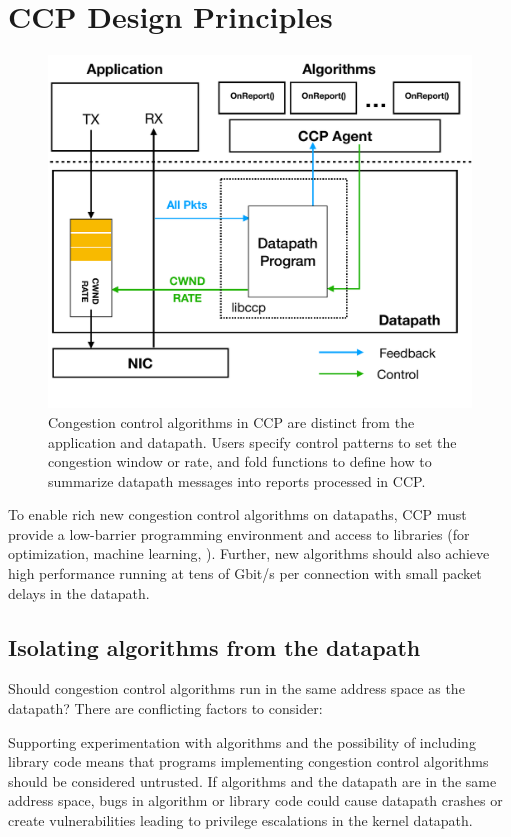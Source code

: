 \section{CCP Design Principles}
\label{s:design}
%
\begin{figure}[t]
\centering
    \includegraphics[width=\columnwidth]{img/ccp_design_sigcomm}
    \caption{Congestion control algorithms in CCP are distinct from the application and datapath.
    Users specify control patterns to set the congestion window or rate,
    and fold functions to define how to summarize datapath messages into reports processed in CCP.}\label{fig:design}
\end{figure}
%

To enable rich new congestion control algorithms on datapaths,
CCP must provide a low-barrier programming environment and access
to libraries (\eg for optimization, machine learning, \etc).
%
Further, new algorithms should also achieve high performance running at tens of
Gbit/s per connection with small packet delays in the datapath.

\subsection{Isolating algorithms from the datapath}
\label{s:datapath:isolation}
Should congestion control algorithms run in the same address space as the
datapath? There are conflicting factors to consider:

 Supporting experimentation with algorithms and the possibility of
including \userspace library code means that programs implementing congestion
control algorithms should be considered untrusted. If algorithms and the
datapath are in the same address space, bugs in algorithm or library code could
cause datapath crashes or create vulnerabilities leading to privilege
escalations in the kernel datapath.

